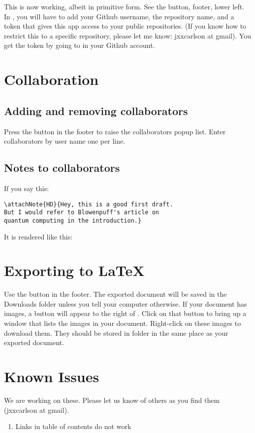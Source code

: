 This is now working, albeit in primitive form.  See the  button, footer, lower left. In , you will have to add your Github username, the repository name, and a token that gives this app access to your public repositories.  (If you know how to restrict this to a specific repository, please let me know: jxxcarlson at gmail).  You get the token by going to  in your Github account.


\section{Collaboration}

\subsection{Adding and removing collaborators}

Press the  button in the footer to raise the collaborators popup list.  Enter collaborators by user name one per line.


\subsection{Notes to collaborators}

If you say this:

\begin{verbatim}
\attachNote{HD}{Hey, this is a good first draft.
But I would refer to Blowenpuff's article on
quantum computing in the introduction.}
\end{verbatim}

It is rendered like this:


\section{Exporting to LaTeX}

Use the  button in the footer.  The exported document will be saved in the Downloads folder unless you tell your computer otherwise.  If your document has images, a button  will appear to the right of .  Click on that button to bring up a window that lists the images in your document.  Right-click on these images to download them.  They should be stored in folder  in the same place as your exported document.


\section{Known Issues}

We are working on these.  Please let us know of others as you find them (jxxcarlson at gmail).

\begin{enumerate}

\item Links in table of contents do not work

\end{enumerate}

